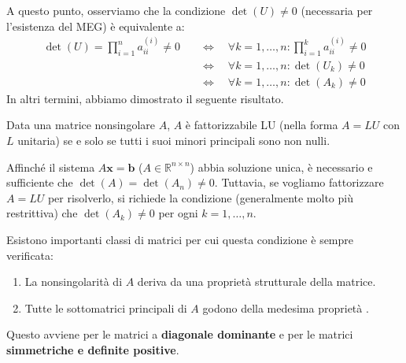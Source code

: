 A questo punto, osserviamo che la condizione $\det(U) \neq 0$ (necessaria per l'esistenza del MEG) è equivalente a:
\begin{align*}
    \det(U) = \prod_{i=1}^n a_{ii}^{(i)} \neq 0 \quad &\Leftrightarrow \quad \forall k=1, \dots, n: \prod_{i=1}^k a_{ii}^{(i)} \neq 0 \\
    &\Leftrightarrow \quad \forall k=1, \dots, n: \det(U_k) \neq 0 \\
    &\Leftrightarrow \quad \forall k=1, \dots, n: \det(A_k) \neq 0
\end{align*}
In altri termini, abbiamo dimostrato il seguente risultato.

\begin{teorema}
Data una matrice nonsingolare $A$, $A$ è fattorizzabile LU (nella forma $A=LU$ con $L$ unitaria) se e solo se tutti i suoi minori principali sono non nulli.
\end{teorema}

\begin{osservazione}
Affinché il sistema $A\mathbf{x} = \mathbf{b}$ ($A \in \mathbb{R}^{n \times n}$) abbia soluzione unica, è necessario e sufficiente che $\det(A) = \det(A_n) \neq 0$.
Tuttavia, se vogliamo fattorizzare $A=LU$ per risolverlo, si richiede la condizione (generalmente molto più restrittiva) che $\det(A_k) \neq 0$ per ogni $k=1, \dots, n$.

Esistono importanti classi di matrici per cui questa condizione è sempre verificata:
\begin{enumerate}
    \item La nonsingolarità di $A$ deriva da una proprietà strutturale della matrice.
    \item Tutte le sottomatrici principali di $A$ godono della medesima proprietà .
\end{enumerate}
Questo avviene per le matrici a \textbf{diagonale dominante} e per le matrici \textbf{simmetriche e definite positive}.
\end{osservazione}

